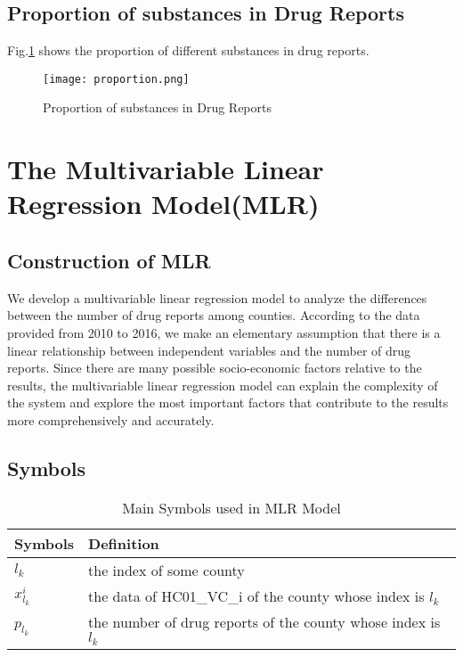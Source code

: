 \documentclass{mcmthesis}
\begin{document}
\subsection{Proportion of substances in Drug Reports} 
Fig.\ref{fig:proportion of drug reports} shows the proportion of different substances in drug reports.

\begin{figure}[!h]
\small
\centering
\texttt{[image: proportion.png]}
\caption{Proportion of substances in Drug Reports} \label{fig:proportion of drug reports}
\end{figure}



\section{The Multivariable Linear Regression Model(MLR)}

\subsection{Construction of MLR}

  We develop a multivariable linear regression model to analyze the differences between the number of drug reports among counties. According to the data provided from 2010 to 2016, we make an elementary assumption that there is a linear relationship between independent variables and the number of drug reports. Since there are many possible socio-economic factors relative to the results, the multivariable linear regression model can explain the complexity of the system and explore the most important factors that contribute to the results more comprehensively and accurately.\par

  \subsection{Symbols}


\begin{table}[!h]
\centering
\caption{Main Symbols used in MLR Model} %
\begin{tabular}{ll}
\toprule[2.5pt]
\textbf{Symbols}& \textbf{Definition} \\
\midrule[1.5pt]
 $l_k$   & the index of some county     \\
 \midrule
 $x_{l_k}^i$ & the data of HC01\_VC\_i of the county whose index is $l_k$   \\
 \midrule
 $p_{l_k}$ & the number of drug reports of the county whose index is $l_k$  \\

\bottomrule
\end{tabular}
\end{table}
\end{document}
